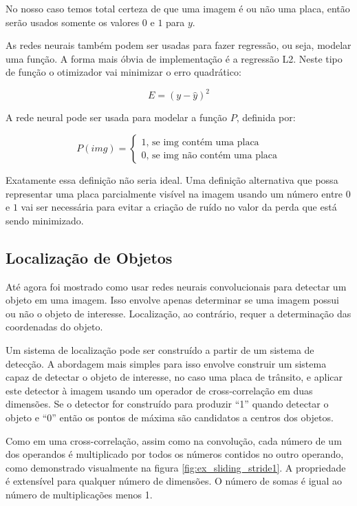 No nosso caso temos total certeza de que uma imagem é ou não uma placa, então
serão usados somente os valores $0$ e $1$ para $y$.

As redes neurais também podem ser usadas para fazer regressão, ou seja, modelar
uma função. A forma mais óbvia de implementação é a regressão L2. Neste tipo de
função o otimizador vai minimizar o erro quadrático:

\begin{equation}
	E=\left( y - \widehat{y} \right)^2
\end{equation}

A rede neural pode ser usada para modelar a função $P$, definida por:

\begin{equation}
	P(img) = \begin{cases}
		1 \text{, se img contém uma placa} \\
		0 \text{, se img não contém uma placa}
	\end{cases}
\end{equation}

Exatamente essa definição não seria ideal. Uma definição alternativa que possa
representar uma placa parcialmente visível na imagem usando um número entre 0 e
$1$ vai ser necessária para evitar a criação de ruído no valor da perda que está
sendo minimizado.

\subsection{Localização de Objetos}
Até agora foi mostrado como usar redes neurais convolucionais para detectar um
objeto em uma imagem. Isso envolve apenas determinar se uma imagem possui ou não
o objeto de interesse. Localização, ao contrário, requer a determinação das
coordenadas do objeto.

Um sistema de localização pode ser construído a partir de um sistema de
detecção. A abordagem mais simples para isso envolve construir um sistema capaz
de detectar o objeto de interesse, no caso uma placa de trânsito, e aplicar este
detector à imagem usando um operador de cross-correlação em duas dimensões. Se o
detector for construído para produzir “1” quando detectar o objeto e “0” então
os pontos de máxima são candidatos a centros dos objetos.

Como em uma cross-correlação, assim como na convolução, cada número de um dos
operandos é multiplicado por todos os números contidos no outro operando, como
demonstrado visualmente na figura \ref{fig:ex_sliding_stride1}. A propriedade
é extensível para qualquer número de dimensões. O número de somas é igual ao
número de multiplicações menos 1.


